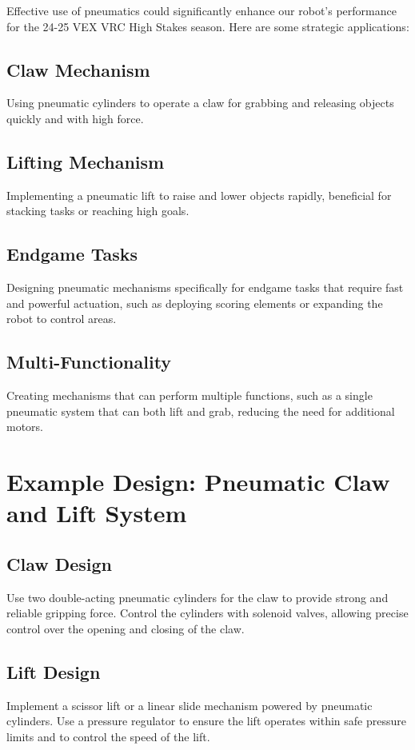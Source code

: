 Effective use of pneumatics could significantly enhance our robot's performance for the 24-25 VEX VRC High Stakes season. Here are some strategic applications:

\subsection*{Claw Mechanism}
Using pneumatic cylinders to operate a claw for grabbing and releasing objects quickly and with high force.

\subsection*{Lifting Mechanism}
Implementing a pneumatic lift to raise and lower objects rapidly, beneficial for stacking tasks or reaching high goals.

\subsection*{Endgame Tasks}
Designing pneumatic mechanisms specifically for endgame tasks that require fast and powerful actuation, such as deploying scoring elements or expanding the robot to control areas.

\subsection*{Multi-Functionality}
Creating mechanisms that can perform multiple functions, such as a single pneumatic system that can both lift and grab, reducing the need for additional motors.

\section*{Example Design: Pneumatic Claw and Lift System}

\subsection*{Claw Design}
Use two double-acting pneumatic cylinders for the claw to provide strong and reliable gripping force. Control the cylinders with solenoid valves, allowing precise control over the opening and closing of the claw.

\subsection*{Lift Design}
Implement a scissor lift or a linear slide mechanism powered by pneumatic cylinders. Use a pressure regulator to ensure the lift operates within safe pressure limits and to control the speed of the lift.

